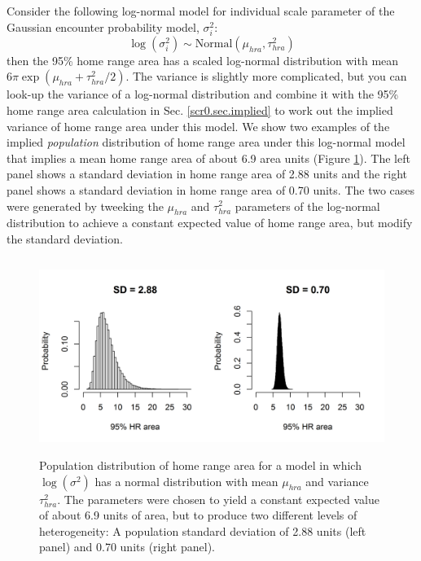 Consider the following log-normal model for individual scale parameter
of the Gaussian encounter probability model, $\sigma_{i}^{2}$:
\[
 \log(\sigma^{2}_{i}) \sim \mbox{Normal}(\mu_{hra}, \tau^{2}_{hra})
\]
then the 95\% home range area has a scaled
log-normal distribution with mean $6 \pi \exp(\mu_{hra} +
\tau^{2}_{hra}/2)$. The variance is slightly more complicated, but you
can look-up  the variance of a log-normal distribution and combine it
with the 95\% home range area calculation in
Sec. \ref{scr0.sec.implied} to work out the implied variance of home
range area under this model.
We show two examples of the implied {\it population} distribution of
home range area under this log-normal model that implies 
 a mean home range area of about 6.9 area units (Figure
\ref{covariates.fig.one}). The left panel shows a standard deviation
in home range area of 2.88 units and the right panel shows a standard
deviation in home range area of 0.70 units. The two cases were
generated by tweeking the $\mu_{hra}$ and $\tau^{2}_{hra}$ parameters
of the log-normal distribution to achieve a constant expected value of
home range area, but modify the standard deviation. 




\begin{figure}[ht]
\begin{center}
\includegraphics[height=2.5in,width=5in]{Ch8-Covariates/figs/area_heterogeneity.png}
\end{center}
\caption{
Population distribution of home range area for a model in which
$\log(\sigma^{2})$ has a normal distribution with mean $\mu_{hra}$ and
variance $\tau^{2}_{hra}$. The parameters were chosen to yield a
constant expected value of about 6.9 units of area, but to produce two
different levels of heterogeneity: A population standard deviation of
2.88 units (left panel) and 0.70 units (right panel). 
}
\label{covariates.fig.one}
\end{figure}



